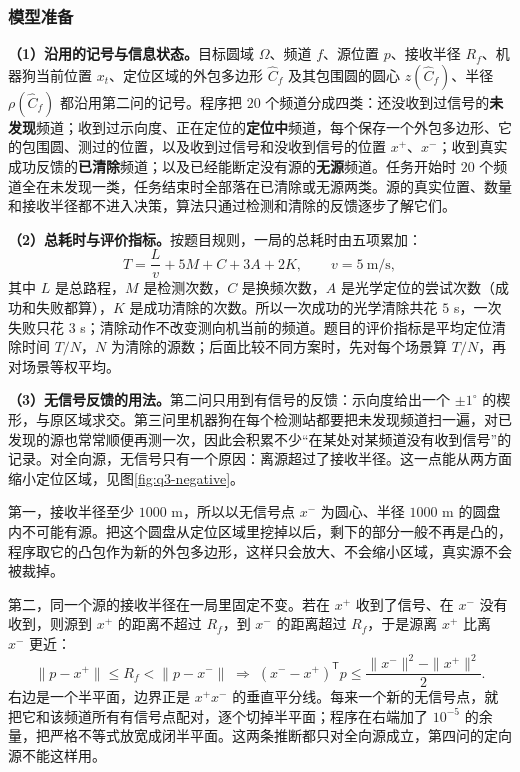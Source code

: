 \subsubsection{模型准备}\label{sec:q3-1}

\textbf{（1）沿用的记号与信息状态。}目标圆域 $\Omega$、频道 $f$、源位置 $p$、接收半径 $R_f$、机器狗当前位置 $x_t$、定位区域的外包多边形 $\widehat C_f$ 及其包围圆的圆心 $z(\widehat C_f)$、半径 $\rho(\widehat C_f)$ 都沿用第二问的记号。程序把 $20$ 个频道分成四类：还没收到过信号的\textbf{未发现}频道；收到过示向度、正在定位的\textbf{定位中}频道，每个保存一个外包多边形、它的包围圆、测过的位置，以及收到过信号和没收到信号的位置 $x^+$、$x^-$；收到真实成功反馈的\textbf{已清除}频道；以及已经能断定没有源的\textbf{无源}频道。任务开始时 $20$ 个频道全在未发现一类，任务结束时全部落在已清除或无源两类。源的真实位置、数量和接收半径都不进入决策，算法只通过检测和清除的反馈逐步了解它们。

\textbf{（2）总耗时与评价指标。}按题目规则，一局的总耗时由五项累加：
\begin{equation}\label{eq:q3-2}
T=\frac{L}{v}+5M+C+3A+2K,\qquad v=5\ \text{m/s},
\end{equation}
其中 $L$ 是总路程，$M$ 是检测次数，$C$ 是换频次数，$A$ 是光学定位的尝试次数（成功和失败都算），$K$ 是成功清除的次数。所以一次成功的光学清除共花 $5$ s，一次失败只花 $3$ s；清除动作不改变测向机当前的频道。题目的评价指标是平均定位清除时间 $T/N$，$N$ 为清除的源数；后面比较不同方案时，先对每个场景算 $T/N$，再对场景等权平均。

\textbf{（3）无信号反馈的用法。}第二问只用到有信号的反馈：示向度给出一个 $\pm1^\circ$ 的楔形，与原区域求交。第三问里机器狗在每个检测站都要把未发现频道扫一遍，对已发现的源也常常顺便再测一次，因此会积累不少“在某处对某频道没有收到信号”的记录。对全向源，无信号只有一个原因：离源超过了接收半径。这一点能从两方面缩小定位区域，见图\ref{fig:q3-negative}。

第一，接收半径至少 $1000$ m，所以以无信号点 $x^-$ 为圆心、半径 $1000$ m 的圆盘内不可能有源。把这个圆盘从定位区域里挖掉以后，剩下的部分一般不再是凸的，程序取它的凸包作为新的外包多边形，这样只会放大、不会缩小区域，真实源不会被裁掉。

第二，同一个源的接收半径在一局里固定不变。若在 $x^+$ 收到了信号、在 $x^-$ 没有收到，则源到 $x^+$ 的距离不超过 $R_f$，到 $x^-$ 的距离超过 $R_f$，于是源离 $x^+$ 比离 $x^-$ 更近：
\begin{equation}\label{eq:q3-3}
\|p-x^+\|\le R_f<\|p-x^-\|
\;\Longrightarrow\;
(x^--x^+)^{\mathsf T}p\le\frac{\|x^-\|^2-\|x^+\|^2}{2}.
\end{equation}
右边是一个半平面，边界正是 $x^+x^-$ 的垂直平分线。每来一个新的无信号点，就把它和该频道所有有信号点配对，逐个切掉半平面；程序在右端加了 $10^{-5}$ 的余量，把严格不等式放宽成闭半平面。这两条推断都只对全向源成立，第四问的定向源不能这样用。

